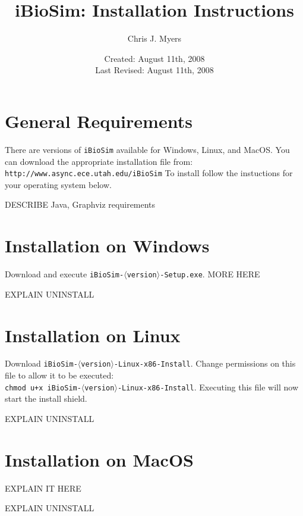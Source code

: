 \documentclass[titlepage,11pt]{article}
\title{iBioSim: Installation Instructions}
\author{Chris J. Myers}
\date{Created: August 11th, 2008\\
  Last Revised: August 11th, 2008
}
\begin{document}
\maketitle

  
\tableofcontents

\clearpage
  

\section{General Requirements}

\noindent
There are versions of {\tt iBioSim} available for Windows, Linux, and
MacOS.  You can download the appropriate installation file from:\\
{\tt http://www.async.ece.utah.edu/iBioSim}
To install follow the instuctions for your operating system below.

DESCRIBE Java, Graphviz requirements

\section{Installation on Windows}

\noindent
Download and execute {\tt iBioSim-$\langle$version$\rangle$-Setup.exe}.
MORE HERE

EXPLAIN UNINSTALL

\section{Installation on Linux}

\noindent
Download {\tt iBioSim-$\langle$version$\rangle$-Linux-x86-Install}.
Change permissions on this file to allow it to be executed:\\
{\tt chmod u+x iBioSim-$\langle$version$\rangle$-Linux-x86-Install}.
Executing this file will now start the install shield.

EXPLAIN UNINSTALL

\section{Installation on MacOS}

\noindent
EXPLAIN IT HERE

EXPLAIN UNINSTALL
\end{document}
